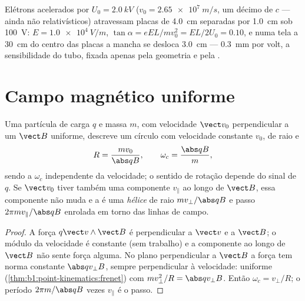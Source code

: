 \begin{example}\label{ex:b1:charged-particles:crt}
Elétrons acelerados por $U_0 = \qty{2.0}{kV}$ ($v_0 = \qty{2.65e7}{m/s}$,
um décimo de $c$ --- ainda não relativísticos) atravessam placas de \qty{4.0}{cm}
separadas por \qty{1.0}{cm} sob \qty{100}{V}: $E = \qty{1.0e4}{V/m}$,
$\tan\alpha = eEL/mv_0^2 = EL/2U_0 = 0.10$, e numa tela a \qty{30}{cm}
do centro das placas a mancha se desloca \qty{3.0}{cm} --- \qty{0.3}{mm}
por volt, a sensibilidade do tubo, fixada apenas pela geometria e pela
.
\end{example}

\section{Campo magnético uniforme}

\begin{theorem}\label{thm:b1:charged-particles:bfield}
Uma partícula de carga $q$ e massa $m$, com velocidade $\vect v_0$ perpendicular a
um $\vect B$ uniforme, descreve um círculo com velocidade constante $v_0$, de raio
e 
\[
R = \frac{mv_0}{\abs q B}, \qquad \omega_c = \frac{\abs q B}{m},
\]
sendo a \emph{} $\omega_c$ independente da velocidade;
o sentido de rotação depende do sinal de $q$. Se $\vect v_0$ tiver também
uma componente $v_\parallel$ ao longo de $\vect B$, essa componente não muda e
a  é uma \emph{hélice} de raio $mv_\perp/\abs qB$ e passo
$2\pi mv_\parallel/\abs qB$ enrolada em torno das linhas de campo.
\end{theorem}

\begin{proof}
A força $q\vect v\wedge\vect B$ é perpendicular a $\vect v$ e a $\vect B$;
o módulo da velocidade é constante (sem trabalho) e a componente ao longo de $\vect B$ não sente
força alguma. No plano perpendicular a $\vect B$ a força tem norma constante
$\abs qv_\perp B$, sempre perpendicular à velocidade: 
uniforme (\cref{thm:b1:point-kinematics:frenet}) com $mv_\perp^2/R =
\abs qv_\perp B$. Então $\omega_c = v_\perp/R$; o período $2\pi m/\abs qB$ vezes
$v_\parallel$ é o passo.
\end{proof}

